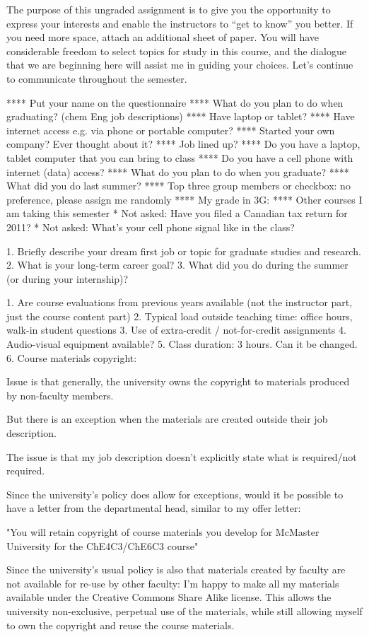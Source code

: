 The purpose of this ungraded assignment is to give you the opportunity to express your interests and enable the instructors to “get to know” you better.  If you need more space, attach an additional sheet of paper.
You will have considerable freedom to select topics for study in this course, and the dialogue that we are beginning here will assist me in guiding your choices. Let’s continue to communicate throughout the semester.  


**** Put your name on the questionnaire
**** What do you plan to do when graduating? (chem Eng job descriptions)
**** Have laptop or tablet?
**** Have internet access e.g. via phone or portable computer?
**** Started your own company? Ever thought about it?
**** Job lined up?
**** Do you have a laptop, tablet computer that you can bring to class
**** Do you have a cell phone with internet (data) access?
**** What do you plan to do when you graduate?
**** What did you do last summer?
**** Top three group members or checkbox: no preference, please assign me randomly
**** My grade in 3G:
**** Other courses I am taking this semester
* Not asked: Have you filed a Canadian tax return for 2011?
* Not asked: What's your cell phone signal like in the class?



1.  Briefly describe your dream first job or topic for graduate studies and research.
2.  What is your long-term career goal?
3.  What did you do during the summer (or during your internship)?


1. Are course evaluations from previous years available (not the instructor part, just the course content part)
2. Typical load outside teaching time: office hours, walk-in student questions
3. Use of extra-credit / not-for-credit assignments
4. Audio-visual equipment available?
5. Class duration: 3 hours.  Can it be changed.
6. Course materials copyright:

Issue is that generally, the university owns the copyright to materials produced by non-faculty members. 

But there is an exception when the materials are created outside their job description.

The issue is that my job description doesn't explicitly state what is required/not required.  

Since the university's policy does allow for exceptions, would it be possible to have a letter from the departmental head, similar to my offer letter: 

	"You will retain copyright of course materials you develop for McMaster
	 University for the ChE4C3/ChE6C3 course"

Since the university's usual policy is also that materials created by faculty are not available for re-use by other faculty: I'm happy to make all my materials available under the Creative Commons Share Alike license.  This allows the university non-exclusive, perpetual use of the materials, while still allowing myself to own the copyright and reuse the course materials.
